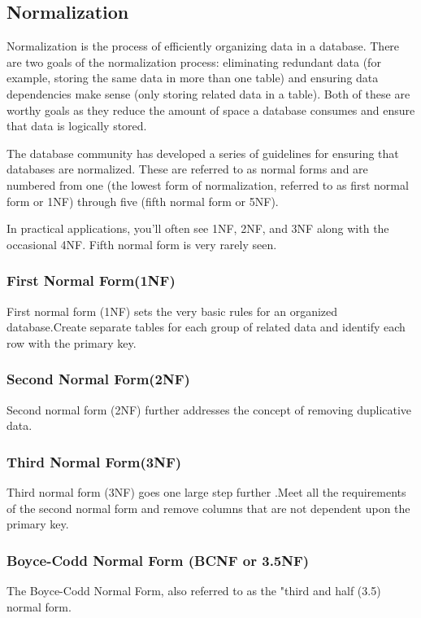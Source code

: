 \documentclass[a4paper,12pt]{article}
\begin{document}
\subsection{Normalization}\vspace{2mm}
Normalization is the process of efficiently organizing data in a database. There are two goals of the normalization process: eliminating redundant data (for example, storing the same data in more than one table) and ensuring data dependencies make sense (only storing related data in a table). Both of these are worthy goals as they reduce the amount of space a database consumes and ensure that data is logically stored.\par\vspace{2mm}
The database community has developed a series of guidelines for ensuring that databases are normalized. These are referred to as normal forms and are numbered from one (the lowest form of normalization, referred to as first normal form or 1NF) through five (fifth normal form or 5NF).
\par\vspace{2mm}
 In practical applications, you'll often see 1NF, 2NF, and 3NF along with the occasional 4NF. Fifth normal form is very rarely seen.\vspace{2mm}
\newpage
\subsubsection{First Normal Form(1NF)}
First normal form (1NF) sets the very basic rules for an organized database.Create separate tables for each group of related data and identify each row with the primary key.\vspace{2mm}
\subsubsection{Second Normal Form(2NF)}
Second normal form (2NF) further addresses the concept of removing duplicative data.\vspace{2mm}
\subsubsection{Third Normal Form(3NF)}
Third normal form (3NF) goes one large step further .Meet all the requirements of the second normal form and remove columns that are not dependent upon the primary key.\vspace{2mm}
\subsubsection{Boyce-Codd Normal Form (BCNF or 3.5NF)}
The Boyce-Codd Normal Form, also referred to as the "third and half (3.5) normal form.\vspace{2mm}
\end{document}
